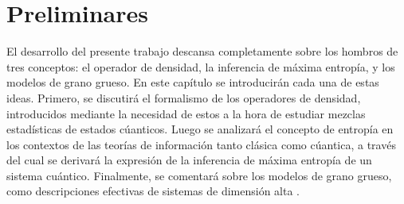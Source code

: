 \chapter{Preliminares}
El desarrollo del presente trabajo descansa completamente sobre los hombros de tres conceptos: el operador de densidad, la inferencia de máxima entropía, y los modelos de grano grueso. En este capítulo se introducirán cada una de estas ideas. Primero, se discutirá el formalismo de los operadores de densidad, introducidos mediante la necesidad de estos a la hora de estudiar mezclas estadísticas de estados cúanticos. Luego se analizará el concepto de entropía en los contextos de las teorías de información tanto clásica como cúantica, a través del cual se derivará la expresión de la inferencia de máxima entropía de un sistema cuántico. Finalmente, se comentará sobre los modelos de grano grueso, como descripciones efectivas de sistemas de dimensión alta .





\newpage